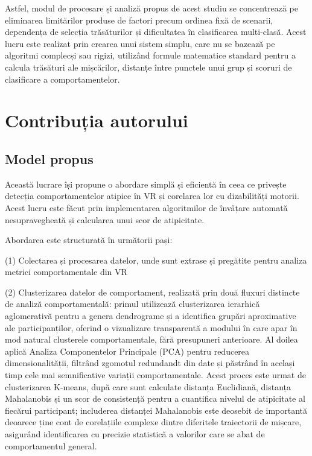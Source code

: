 \documentclass[12pt,a4paper]{report}
\theoremstyle{definition}
\theoremstyle{remark}
\begin{document}
Astfel, modul de procesare și analiză propus de acest studiu se concentrează pe eliminarea limitărilor produse de factori precum ordinea fixă de scenarii, dependența de selecția trăsăturilor și dificultatea în clasificarea multi-clasă. Acest lucru este realizat prin crearea unui sistem simplu, care nu se bazează pe algoritmi complecși sau rigizi, utilizând formule matematice standard pentru a calcula trăsături ale mișcărilor, distanțe între punctele unui grup și scoruri de clasificare a comportamentelor. 


\chapter{Contribuția autorului}


\section{Model propus}

Această lucrare își propune o abordare simplă și eficientă în ceea ce privește detecția comportamentelor atipice în VR și corelarea lor cu dizabilități motorii. Acest lucru este făcut prin implementarea algoritmilor de învâțare automată nesupravegheată și calcularea unui scor de atipicitate. 

Abordarea este structurată în următorii pași:

(1) Colectarea și procesarea datelor, unde sunt extrase și pregătite pentru analiza metrici comportamentale din VR

(2) Clusterizarea datelor de comportament, realizată prin două fluxuri distincte de analiză comportamentală: primul utilizează clusterizarea ierarhică aglomerativă pentru a genera dendrograme și a identifica grupări aproximative ale participanților, oferind o vizualizare transparentă a modului în care apar în mod natural clusterele comportamentale, fără presupuneri anterioare. Al doilea aplică Analiza Componentelor Principale (PCA) pentru reducerea dimensionalității, filtrând zgomotul redundandt din date și păstrând în același timp cele mai semnificative variații comportamentale. Acest proces este urmat de clusterizarea K-means, după care sunt calculate distanța Euclidiană, distanța Mahalanobis și un scor de consistență pentru a cuantifica nivelul de atipicitate al fiecărui participant; includerea distanței Mahalanobis este deosebit de importantă deoarece ține cont de corelațiile complexe dintre diferitele traiectorii de mișcare, asigurând identificarea cu precizie statistică a valorilor care se abat de comportamentul general.
\end{document}
